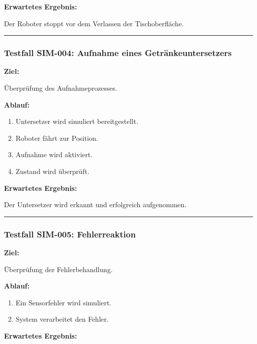 \documentclass[
]{article}
\providecommand{\tightlist}{%
  \setlength{\itemsep}{0pt}\setlength{\parskip}{0pt}}
\begin{document}
\textbf{Erwartetes Ergebnis:}

Der Roboter stoppt vor dem Verlassen der Tischoberfläche.

\begin{center}\rule{0.5\linewidth}{0.5pt}\end{center}

\subsubsection{Testfall SIM-004: Aufnahme eines
Getränkeuntersetzers}\label{testfall-sim-004-aufnahme-eines-getruxe4nkeuntersetzers}

\textbf{Ziel:}

Überprüfung des Aufnahmeprozesses.

\textbf{Ablauf:}

\begin{enumerate}
\def\labelenumi{\arabic{enumi}.}
\tightlist
\item
  Untersetzer wird simuliert bereitgestellt.
\item
  Roboter fährt zur Position.
\item
  Aufnahme wird aktiviert.
\item
  Zustand wird überprüft.
\end{enumerate}

\textbf{Erwartetes Ergebnis:}

Der Untersetzer wird erkannt und erfolgreich aufgenommen.

\begin{center}\rule{0.5\linewidth}{0.5pt}\end{center}

\subsubsection{Testfall SIM-005:
Fehlerreaktion}\label{testfall-sim-005-fehlerreaktion}

\textbf{Ziel:}

Überprüfung der Fehlerbehandlung.

\textbf{Ablauf:}

\begin{enumerate}
\def\labelenumi{\arabic{enumi}.}
\tightlist
\item
  Ein Sensorfehler wird simuliert.
\item
  System verarbeitet den Fehler.
\end{enumerate}

\textbf{Erwartetes Ergebnis:}
\end{document}
